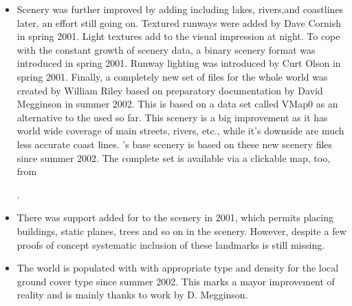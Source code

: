 \begin{itemize}
\item Scenery was further improved by adding  including lakes, rivers,and coastlines later, an effort still going on. Textured runways were added by Dave Cornish in spring 2001. Light textures add to the visual impression at night. To cope with the constant growth of scenery data, a binary scenery format was introduced in spring 2001. Runway lighting was introduced by Curt Olson in spring 2001. Finally, a completely new set of  files for the whole world was created by William Riley based on preparatory documentation by David Megginson in summer 2002. This is based on a data set called VMap0 as an alternative to the  used so far. This scenery is a big improvement as it has world wide coverage of main streets, rivers, etc., while it's downside are much less accurate coast lines. \FlightGear{}'s base scenery is based on these new scenery files since summer 2002. The complete set is available via a clickable map, too, from
\medskip

.
 \medskip
 \item There was support added for  to the scenery in 2001, which permits placing buildings, static planes, trees and so on in the scenery. However, despite a few proofs of concept systematic inclusion of these landmarks is still missing.
\item The world is populated with  with appropriate type and density for the local ground cover type since summer 2002. This marks a mayor improvement of reality and is mainly thanks to work by D. Megginson.
\end{itemize}

